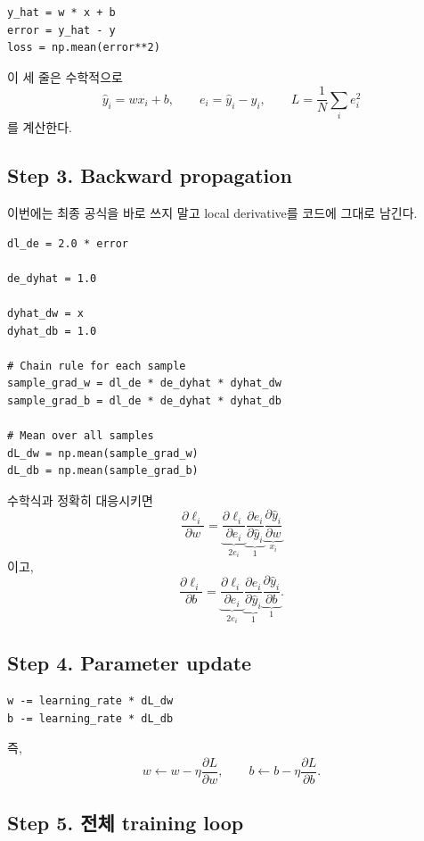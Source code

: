 \documentclass[11pt,a4paper]{article}
\begin{document}
\begin{lstlisting}
y_hat = w * x + b
error = y_hat - y
loss = np.mean(error**2)
\end{lstlisting}

이 세 줄은 수학적으로
\[
\widehat y_i=wx_i+b,
\qquad
e_i=\widehat y_i-y_i,
\qquad
L=\frac1N\sum_i e_i^2
\]
를 계산한다.

\subsection{Step 3. Backward propagation}

이번에는 최종 공식을 바로 쓰지 말고 local derivative를 코드에 그대로 남긴다.

\begin{lstlisting}
dl_de = 2.0 * error

de_dyhat = 1.0

dyhat_dw = x
dyhat_db = 1.0

# Chain rule for each sample
sample_grad_w = dl_de * de_dyhat * dyhat_dw
sample_grad_b = dl_de * de_dyhat * dyhat_db

# Mean over all samples
dL_dw = np.mean(sample_grad_w)
dL_db = np.mean(sample_grad_b)
\end{lstlisting}

수학식과 정확히 대응시키면
\[
\frac{\partial \ell_i}{\partial w}
=
\underbrace{\frac{\partial \ell_i}{\partial e_i}}_{2e_i}
\underbrace{\frac{\partial e_i}{\partial \widehat y_i}}_{1}
\underbrace{\frac{\partial \widehat y_i}{\partial w}}_{x_i}
\]
이고,
\[
\frac{\partial \ell_i}{\partial b}
=
\underbrace{\frac{\partial \ell_i}{\partial e_i}}_{2e_i}
\underbrace{\frac{\partial e_i}{\partial \widehat y_i}}_{1}
\underbrace{\frac{\partial \widehat y_i}{\partial b}}_{1}.
\]

\subsection{Step 4. Parameter update}

\begin{lstlisting}
w -= learning_rate * dL_dw
b -= learning_rate * dL_db
\end{lstlisting}

즉,
\[
w\leftarrow w-\eta\frac{\partial L}{\partial w},
\qquad
b\leftarrow b-\eta\frac{\partial L}{\partial b}.
\]

\subsection{Step 5. 전체 training loop}
\end{document}
